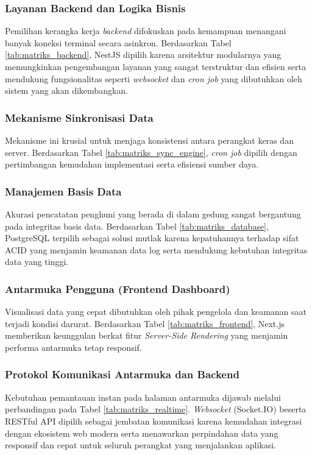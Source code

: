 \subsubsection{Layanan Backend dan Logika Bisnis}
Pemilihan kerangka kerja \textit{backend} difokuskan pada kemampuan menangani banyak koneksi terminal secara asinkron. Berdasarkan Tabel \ref{tab:matriks_backend}, NestJS dipilih karena arsitektur modularnya yang memungkinkan pengembangan layanan yang sangat terstruktur dan efisien serta mendukung fungsionalitas seperti \textit{websocket} dan \textit{cron job} yang dibutuhkan oleh sistem yang akan dikembangkan.


\subsubsection{Mekanisme Sinkronisasi Data}
Mekanisme ini krusial untuk menjaga konsistensi antara perangkat keras dan server. Berdasarkan Tabel \ref{tab:matriks_sync_engine}, \textit{cron job} dipilih dengan pertimbangan kemudahan implementasi serta efisiensi sumber daya.


\subsubsection{Manajemen Basis Data}
Akurasi pencatatan penghuni yang berada di dalam gedung sangat bergantung pada integritas basis data. Berdasarkan Tabel \ref{tab:matriks_database}, PostgreSQL terpilih sebagai solusi mutlak karena kepatuhannya terhadap sifat ACID yang menjamin keamanan data log serta mendukung kebutuhan integritas data yang tinggi.


\subsubsection{Antarmuka Pengguna (Frontend Dashboard)}
Visualisasi data yang cepat dibutuhkan oleh pihak pengelola dan keamanan saat terjadi kondisi darurat. Berdasarkan Tabel \ref{tab:matriks_frontend}, Next.js memberikan keunggulan berkat fitur \textit{Server-Side Rendering} yang menjamin performa antarmuka tetap responsif.


\subsubsection{Protokol Komunikasi Antarmuka dan Backend}
Kebutuhan pemantauan instan pada halaman antarmuka dijawab melalui perbandingan pada Tabel \ref{tab:matriks_realtime}. \textit{Websocket} (Socket.IO) beserta RESTful API dipilih sebagai jembatan komunikasi karena kemudahan integrasi dengan ekosistem web modern serta menawarkan perpindahan data yang responsif dan cepat untuk seluruh perangkat yang menjalankan aplikasi.


